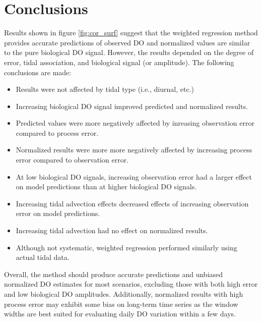 \documentclass{article}\usepackage{graphicx, color}
\begin{document}
\section{Conclusions}
Results shown in figure \cref{fig:cor_surf} suggest that the weighted regression method provides accurate predictions of observed DO and normalized values are similar to the pure biological DO signal. However, the results depended on the degree of error, tidal association, and biological signal (or amplitude).  The following conclusions are made: 
\begin{itemize}
\item Results were not affected by tidal type (i.e., diurnal, etc.)
\item Increasing biological DO signal improved predicted and normalized results.
\item Predicted values were more negatively affected by inreasing observation error compared to process error.
\item Normalized results were more more negatively affected by increasing process error compared to observation error.
\item At low biological DO signals, increasing observation error had a larger effect on model predictions than at higher biological DO signals.
\item Increasing tidal advection effects decreased effects of increasing observation error on model predictions.
\item Increasing tidal advection had no effect on normalized results.
\item Although not systematic, weighted regression performed similarly using actual tidal data.
\end{itemize}
Overall, the method should produce accurate predictions and unbiased normalized DO estimates for most scenarios, excluding those with both high error and low biological DO amplitudes.  Additionally, normalized results with high process error may exhibit some bias on long-term time series as the window widths are best suited for evaluating daily DO variation within a few days.   

\end{document}
